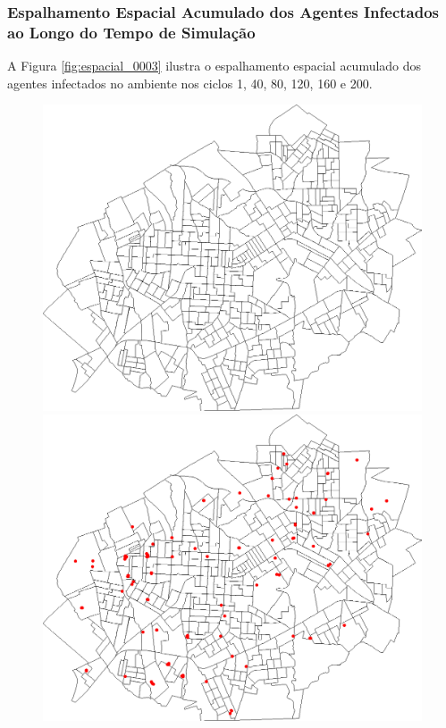 \subsubsection{Espalhamento Espacial Acumulado dos Agentes Infectados ao Longo do Tempo de Simulação}

A Figura \ref{fig:espacial_0003} ilustra o espalhamento espacial acumulado dos agentes infectados no ambiente nos ciclos 1, 40, 80, 120, 160 e 200.

\begin{figure}[H]
  \centering
  \begin{minipage}{.5\textwidth}
    \centering
    \includegraphics[width=1.0\textwidth]{Figuras/Resultados/0003/Saidas/MonteCarlo_0/Simulacao_0/Acumulado/00000.png}
    \captionsetup{labelformat=empty}
  \end{minipage}%
  \begin{minipage}{.5\textwidth}
    \centering
    \includegraphics[width=1.0\textwidth]{Figuras/Resultados/0003/Saidas/MonteCarlo_0/Simulacao_0/Acumulado/00040.png}

\end{minipage}
\end{figure}
